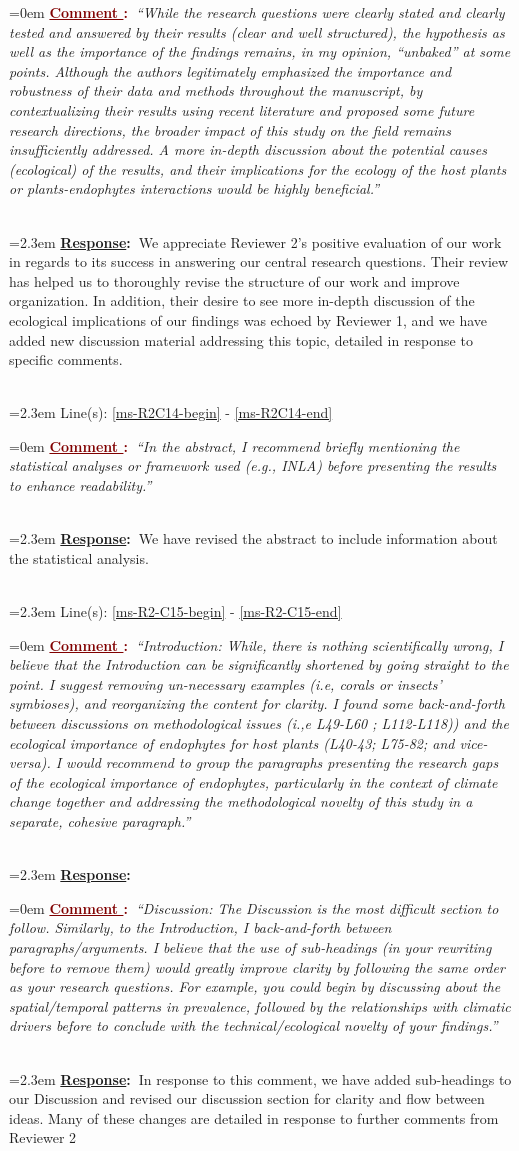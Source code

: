 \documentclass[12pt]{article}
\newcounter{cN}
\newcommand{\comment}[1]{
	\vspace{2em}
	\refstepcounter{cN} %
	\noindent \hangindent=0em \textbf{\textcolor{Maroon}{\uline{Comment \thecN}:~}}\emph{``#1''}
	}
\newcommand{\response}[1]{
	\\[0.25em]
	\hangindent=2.3em \textbf{\textcolor{NavyBlue}{\uline{Response}:~}}#1
	}
\newcommand{\linesref}[2]{
		\\[0.25em]
	\hangindent=2.3em {\color{Mahogany} Line(s): \ref{#1} - \ref{#2}}
}
\begin{document}
\comment{While the research questions were clearly stated and clearly tested and answered by their results (clear and well structured), the hypothesis as well as the importance of the findings remains, in my opinion, “unbaked” at some points. Although the authors legitimately emphasized the importance and robustness of their data and methods throughout the manuscript, by contextualizing their results using recent literature and proposed some future research directions, the broader impact of this study on the field remains insufficiently addressed. A more in-depth discussion about the potential causes (ecological) of the results, and their implications for the ecology of the host plants or plants-endophytes interactions would be highly beneficial.}
\response{We appreciate Reviewer 2's positive evaluation of our work in regards to its success in answering our central research questions. Their review has helped us to thoroughly revise the structure of our work and improve organization. In addition, their desire to see more in-depth discussion of the ecological implications of our findings was echoed by Reviewer 1, and we have added new discussion material addressing this topic, detailed in response to specific comments.}
\linesref{ms-R2C14-begin}{ms-R2C14-end}


\comment{In the abstract, I recommend briefly mentioning the statistical analyses or framework used (e.g., INLA) before presenting the results to enhance readability.}
\response{We have revised the abstract to include information about the statistical analysis.}
\linesref{ms-R2-C15-begin}{ms-R2-C15-end}

\comment{Introduction: While, there is nothing scientifically wrong, I believe that the Introduction can be significantly shortened by going straight to the point. I suggest removing un-necessary examples (i.e, corals or insects’ symbioses), and reorganizing the content for clarity. I found some back-and-forth between discussions on methodological issues (i.,e L49-L60 ; L112-L118)) and the ecological importance of endophytes for host plants (L40-43; L75-82; and vice-versa). I would recommend to group the paragraphs presenting the research gaps of the ecological importance of endophytes, particularly in the context of climate change together and addressing the methodological novelty of this study in a separate, cohesive paragraph.}
\response{}



\comment{Discussion: The Discussion is the most difficult section to follow. Similarly, to the Introduction, I back-and-forth between paragraphs/arguments. I believe that the use of sub-headings (in your rewriting before to remove them) would greatly improve clarity by following the same order as your research questions. For example, you could begin by discussing about the spatial/temporal patterns in prevalence, followed by the relationships with climatic drivers before to conclude with the technical/ecological novelty of your findings.}
\response{In response to this comment, we have added sub-headings to our Discussion and revised our discussion section for clarity and flow between ideas. Many of these changes are detailed in response to further comments from Reviewer 2}
\end{document}
